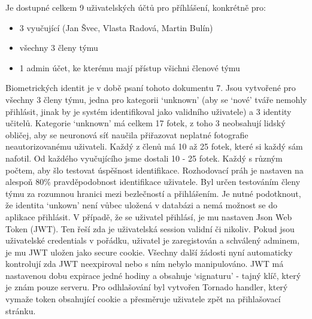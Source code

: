Je dostupné celkem 9 uživatelských účtů pro příhlášení, konkrétně pro: 
\begin{itemize}
    \item 3 vyučující (Jan Švec, Vlasta Radová, Martin Bulín)%
    \item všechny 3 členy týmu
    \item 1 admin účet, ke kterému mají přístup všichni členové týmu
\end{itemize}
Biometrických identit je v době psaní tohoto dokumentu 7. Jsou vytvořené pro všechny 3 členy týmu, jedna pro kategorii `unknown' (aby se `nové' tváře nemohly přihlásit, jinak by je systém identifikoval jako validního uživatele) a 3 identity učitelů. 
Kategorie `unknown' má celkem 17 fotek, z toho 3 neobsahují lidský obličej, aby se neuronová síť naučila přiřazovat neplatné fotografie neautorizovanému uživateli.
Každý z členů má 10 až 25 fotek, které si každý sám nafotil.
Od každého vyučujícího jsme dostali 10 - 25 fotek. Každý s různým počtem, aby šlo testovat úspěšnost identifikace.
Rozhodovací práh je nastaven na alespoň 80\% pravděpodobnost identifikace uživatele. Byl určen testováním členy týmu za rozumnou hranici mezi bezlečností a přihlášením.
Je nutné podotknout, že identita `unkown' není vůbec uložená v databázi a nemá možnost se do aplikace přihlásit.
V případě, že se uživatel přihlásí, je mu nastaven Json Web Token (JWT). Ten řeší zda je uživatelská session validní či nikoliv.
Pokud jsou uživatelské credentials v pořádku, uživatel je zaregistován a schválený adminem, je mu JWT uložen jako secure cookie.
Všechny další žádosti nyní automaticky kontrolují zda JWT neexpiroval nebo s ním nebylo manipulováno. 
JWT má nastavenou dobu expirace jedné hodiny a obsahuje `signaturu' - tajný klíč, který je znám pouze serveru.  
Pro odhlašování byl vytvořen Tornado handler, který vymaže token obsahující cookie a přesměruje uživatele zpět na přihlašovací stránku.